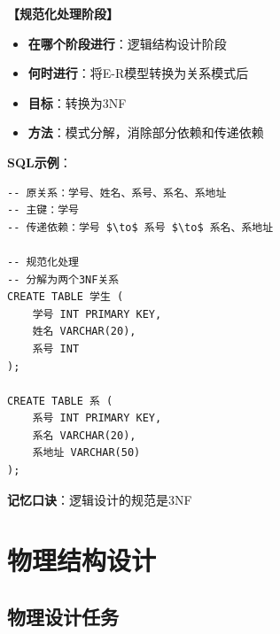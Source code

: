 \documentclass[12pt, a4paper]{article}
\newenvironment{bluebox}[1]{%
  \begin{trivlist}
  \item[\hskip\labelsep \textbf{#1}]
  \setlength{\parskip}{0.5ex}
  \setlength{\itemsep}{0.5ex}
}{%
  \end{trivlist}
  }
\begin{document}
\begin{bluebox}{规范化阶段}
	\textbf{【规范化处理阶段】}

	\begin{itemize}[leftmargin=*, nosep]
		\item \textbf{在哪个阶段进行}：逻辑结构设计阶段
		\item \textbf{何时进行}：将E-R模型转换为关系模式后
		\item \textbf{目标}：转换为3NF
		\item \textbf{方法}：模式分解，消除部分依赖和传递依赖
	\end{itemize}

	\textbf{SQL示例}：
	\begin{verbatim}
-- 原关系：学号、姓名、系号、系名、系地址
-- 主键：学号
-- 传递依赖：学号 $\to$ 系号 $\to$ 系名、系地址

-- 规范化处理
-- 分解为两个3NF关系
CREATE TABLE 学生 (
    学号 INT PRIMARY KEY,
    姓名 VARCHAR(20),
    系号 INT
);

CREATE TABLE 系 (
    系号 INT PRIMARY KEY,
    系名 VARCHAR(20),
    系地址 VARCHAR(50)
);
	\end{verbatim}

	\textbf{记忆口诀}：逻辑设计的规范是3NF
\end{bluebox}

\section{物理结构设计}

\subsection{物理设计任务}
\end{document}
